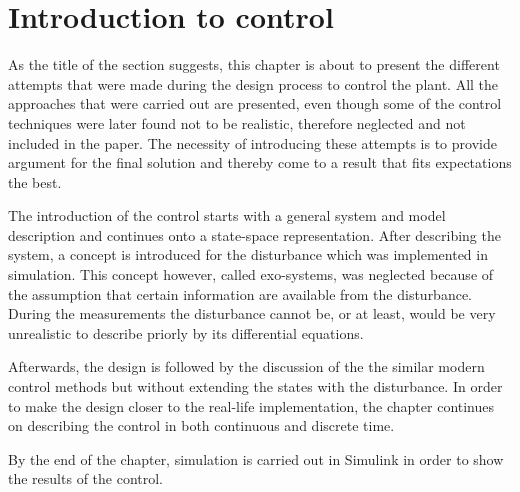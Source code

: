 \section{Introduction to control}
\label{control_intro}

As the title of the section suggests, this chapter is about to present the different attempts that were made during the design process to control the plant. All the approaches that were carried out are presented, even though some of the control techniques were later found not to be realistic, therefore neglected and not included in the paper. The necessity of introducing these attempts is to provide argument for the final solution and thereby come to a result that fits expectations the best. 

The introduction of the control starts with a general system and model description and continues onto a state-space representation. After describing the system, a concept is introduced for the disturbance which was implemented in simulation. This concept however, called exo-systems, was neglected because of the assumption that certain information are available from the disturbance. During the measurements the disturbance cannot be, or at least, would be very unrealistic to describe priorly by its differential equations. 

Afterwards, the design is followed by the discussion of the the similar modern control methods but without extending the states with the disturbance. In order to make the design closer to the real-life implementation, the chapter continues on describing the control in both continuous and discrete time. 

By the end of the chapter, simulation is carried out in Simulink in order to show the results of the control. 